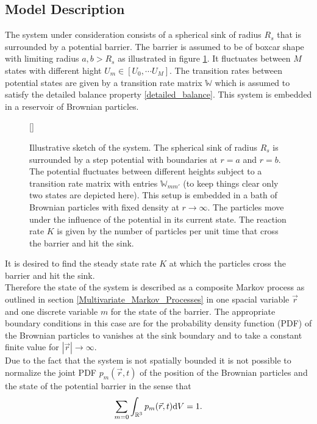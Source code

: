 \subsection{Model Description}
\label{Model_Description}
The system under consideration consists of a spherical sink of radius $R_s$ that is surrounded by a potential barrier. The barrier is assumed to be of boxcar shape with limiting radius $a,b>R_s$ as illustrated in figure \ref{skizze}. It fluctuates between $M$ states with different hight $U_m \in [U_0, \cdots U_M]$. The transition rates between potential states are given by a transition rate matrix $\mathbb{W}$ which is assumed to satisfy the detailed balance property \eqref{detailed_balance}. This system is embedded in a reservoir of Brownian particles.
\begin{figure}[H][\FBwidth]
    {\caption{Illustrative sketch of the system. The spherical sink of radius $R_s$ is surrounded by a step potential with boundaries at $r=a$ and $r=b$. The potential fluctuates between different heights subject to a transition rate matrix with entries $\mathbb{W}_{mm'}$ (to keep things clear only two states are depicted here). This setup is embedded in a bath of Brownian particles with fixed density at $r \rightarrow \infty$. The particles move under the influence of the potential in its current state. The reaction rate $K$ is given by the number of particles per unit time that cross the barrier and hit the sink.}\label{skizze}}
    {}
\end{figure}
It is desired to find the steady state rate $K$ at which the particles cross the barrier and hit the sink.\\
Therefore the state of the system is described as a composite Markov process as outlined in section \ref{Multivariate_Markov_Processes} in one spacial variable $\vec{r}$ and one discrete variable $m$ for the state of the barrier.
The appropriate boundary conditions in this case are for the probability density function (PDF) of the Brownian particles to vanishes at the sink boundary and to take a constant finite value for $|\vec{r}| \rightarrow \infty$. \\
Due to the fact that the system is not spatially bounded it is not possible to normalize the joint PDF $p_m(\vec{r},t)$ of the position of the Brownian particles and the state of the potential barrier in the sense that 
\begin{equation}
    \sum_{m=0} \int_{\mathbb{R}^{3}} p_m(\vec{r},t) {\rm d}V = 1.
    \label{pdfNormalization}
\end{equation}
